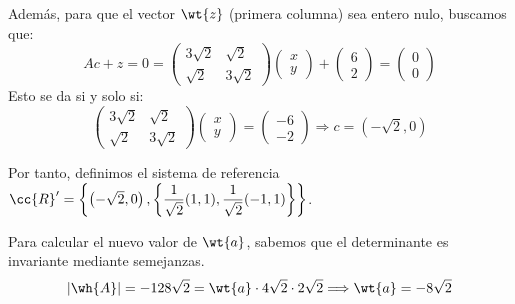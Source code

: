 \begin{ejercicio}
\begin{enumerate}
        Además, para que el vector $\wt{z}$ (primera columna) sea entero nulo, buscamos que:
        \begin{equation*}
            Ac + z = 0
            =  \left(\begin{array}{cc}
                3\sqrt{2} & \sqrt{2} \\
                \sqrt{2} & 3\sqrt{2}
            \end{array}\right)\left(\begin{array}{c}
                x\\y
            \end{array}\right) + \left(\begin{array}{c}
                6 \\ 2
            \end{array}\right) = \left(\begin{array}{c}
                0\\0
            \end{array}\right)
        \end{equation*}
        Esto se da si y solo si:
        \begin{equation*}
            \left(\begin{array}{cc}
                3\sqrt{2} & \sqrt{2} \\
                \sqrt{2} & 3\sqrt{2}
            \end{array}\right)\left(\begin{array}{c}
                x\\y
            \end{array}\right) = \left(\begin{array}{c}
                -6 \\ -2
            \end{array}\right) \Longrightarrow c=\left(-\sqrt{2}, 0\right)
        \end{equation*}

        Por tanto, definimos el sistema de referencia $\cc{R}'=\left\{\left(-\sqrt{2}, 0\right), \left\{\dfrac{1}{\sqrt{2}}(1,1), \dfrac{1}{\sqrt{2}}(-1,1)\right\}\right\}$.

        Para calcular el nuevo valor de $\wt{a}$, sabemos que el determinante es invariante mediante semejanzas.
        \begin{equation*}
            |\wh{A}|=-128\sqrt{2}= \wt{a}\cdot 4\sqrt{2}\cdot 2\sqrt{2}\Longrightarrow \wt{a}=-8\sqrt{2}
        \end{equation*}
        

\end{enumerate}
\end{ejercicio}
